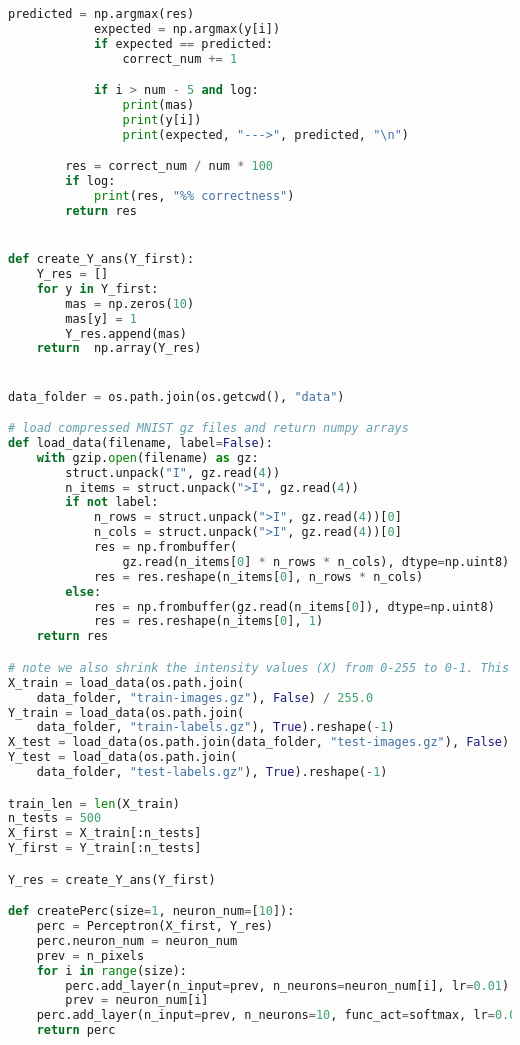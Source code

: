 \documentclass[a4paper, 14pt]{extarticle}
\begin{document}
\begin{lstlisting}[language=Python,caption={main.py},label={lst:code1}]
            predicted = np.argmax(res)
            expected = np.argmax(y[i])
            if expected == predicted:
                correct_num += 1

            if i > num - 5 and log:
                print(mas)
                print(y[i])
                print(expected, "--->", predicted, "\n")

        res = correct_num / num * 100
        if log:
            print(res, "%% correctness")
        return res


def create_Y_ans(Y_first):
    Y_res = []
    for y in Y_first:
        mas = np.zeros(10)
        mas[y] = 1
        Y_res.append(mas)
    return  np.array(Y_res)


data_folder = os.path.join(os.getcwd(), "data")

# load compressed MNIST gz files and return numpy arrays
def load_data(filename, label=False):
    with gzip.open(filename) as gz:
        struct.unpack("I", gz.read(4))
        n_items = struct.unpack(">I", gz.read(4))
        if not label:
            n_rows = struct.unpack(">I", gz.read(4))[0]
            n_cols = struct.unpack(">I", gz.read(4))[0]
            res = np.frombuffer(
                gz.read(n_items[0] * n_rows * n_cols), dtype=np.uint8)
            res = res.reshape(n_items[0], n_rows * n_cols)
        else:
            res = np.frombuffer(gz.read(n_items[0]), dtype=np.uint8)
            res = res.reshape(n_items[0], 1)
    return res

# note we also shrink the intensity values (X) from 0-255 to 0-1. This helps the model converge faster.
X_train = load_data(os.path.join(
    data_folder, "train-images.gz"), False) / 255.0
Y_train = load_data(os.path.join(
    data_folder, "train-labels.gz"), True).reshape(-1)
X_test = load_data(os.path.join(data_folder, "test-images.gz"), False) / 255.0
Y_test = load_data(os.path.join(
    data_folder, "test-labels.gz"), True).reshape(-1)

train_len = len(X_train)
n_tests = 500
X_first = X_train[:n_tests]
Y_first = Y_train[:n_tests]

Y_res = create_Y_ans(Y_first)

def createPerc(size=1, neuron_num=[10]):
    perc = Perceptron(X_first, Y_res)
    perc.neuron_num = neuron_num
    prev = n_pixels
    for i in range(size):
        perc.add_layer(n_input=prev, n_neurons=neuron_num[i], lr=0.01)
        prev = neuron_num[i]
    perc.add_layer(n_input=prev, n_neurons=10, func_act=softmax, lr=0.01)
    return perc


\end{lstlisting}
\end{document}
